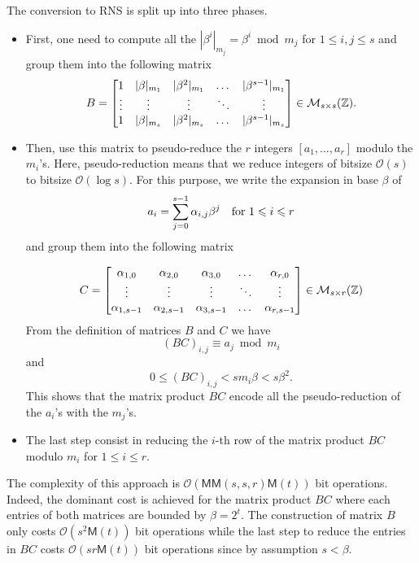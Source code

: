 \documentclass[acmtoms,acmnow]{acmtrans2m}
\def\M{\mathsf{M}} \def\I{\mathsf{I}} \def\R{\mathsf{R}} \def\Q{\mathbb{Q}}
\def\Mat{\mathcal{M}}
\def\bigO{{\ensuremath{\mathcal{O}}}}
\begin{document}
The conversion to RNS is split up into three phases. 
\begin{itemize}
\item  First, one need to compute all the $|\beta^i|_{m_j}=\beta^i \bmod m_j$ for $1\leq i,j\leq s$ and group them into the following matrix 
\[
B=
\begin{bmatrix}
1 & |\beta|_{m_1} & |\beta^2|_{m_1} & \dots & |\beta^{s-1}|_{m_1} \\
\vdots & \vdots & \vdots & \ddots  & \vdots \\
1 & |\beta|_{m_s} & |\beta^2|_{m_s} & \dots & |\beta^{s-1}|_{m_s} \\
\end{bmatrix}\in \Mat_{s \times s} (\Z) .
\]
\item Then, use this matrix to pseudo-reduce the $r$ integers $[a_1,\dots, a_r]$ modulo the $m_i$'s. Here, pseudo-reduction means that we reduce integers of bitsize $\bigO(s)$ to bitsize $\bigO(\log
  s)$. For this purpose, we write the expansion in base $\beta$ of 
\[ a_i = \sum_{j = 0}^{s - 1} \alpha_{i,j} \beta^j \mbox{\quad for } 1 \leqslant i \leqslant r\]
and group them into the following matrix

\[
C=
\begin{bmatrix}
\alpha_{1,0} & \alpha_{2,0} & \alpha_{3,0} & \dots & \alpha_{r,0} \\
\vdots & \vdots & \vdots & \ddots  & \vdots \\
\alpha_{1,s-1} & \alpha_{2,s-1} & \alpha_{3,s-1} & \dots & \alpha_{r,s-1} \\
\end{bmatrix} \in \Mat_{s \times r} (\Z) 
\]
From the definition of matrices $B$ and $C$ we have 
\begin{equation}
(BC)_{i,j} \equiv a_j \bmod m_i
\end{equation}
and 
\begin{equation}
0 \leq (BC)_{i,j} < s m_i\beta < s \beta^2.
\end{equation}
This shows that the matrix product $BC$ encode all the pseudo-reduction of the $a_i$'s with the $m_j$'s.
\item The last step consist in reducing the $i$-th row of the matrix product $BC$ modulo $m_i$ for $1 \leqslant i \leqslant r$.
\end{itemize}


The complexity of this approach is $\bigO(\M\M(s,s,r)\M(t))$ bit operations.
Indeed, the dominant cost is achieved for the matrix product $BC$ where each entries of both matrices are bounded by $\beta=2^t$. The construction of matrix $B$ only costs $\bigO(s^2\M(t))$ bit operations
while the last step to reduce the entries in $BC$ costs $\bigO(sr\M(t))$ bit operations since by assumption $s<\beta$.
\end{document}
